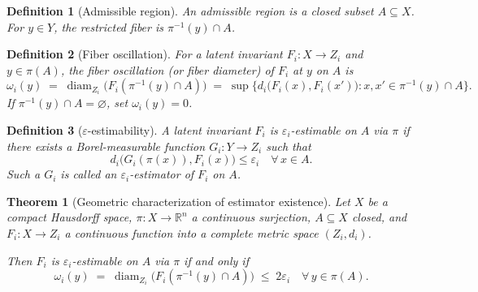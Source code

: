 \documentclass[11pt]{article}
\newtheorem{definition}{Definition}
\newtheorem{theorem}{Theorem}
\begin{document}
\begin{definition}[Admissible region]
An \emph{admissible region} is a closed subset $A\subseteq X$. For $y\in Y$, the \emph{restricted fiber} is $\pi^{-1}(y)\cap A$.
\end{definition}

\begin{definition}[Fiber oscillation]
For a latent invariant $F_i\colon X\to Z_i$ and $y\in\pi(A)$, the \emph{fiber oscillation} (or fiber diameter) of $F_i$ at $y$ on $A$ is
\[
\omega_i(y)\;=\;\operatorname{diam}_{Z_i}\!\bigl(F_i(\pi^{-1}(y)\cap A)\bigr)
\;=\;\sup\bigl\{d_i\bigl(F_i(x),F_i(x')\bigr): x,x'\in\pi^{-1}(y)\cap A\bigr\}.
\]
If $\pi^{-1}(y)\cap A=\varnothing$, set $\omega_i(y)=0$.
\end{definition}

\begin{definition}[$\varepsilon$-estimability]
A latent invariant $F_i$ is \emph{$\varepsilon_i$-estimable} on $A$ via $\pi$ if there exists a Borel-measurable function $G_i\colon Y\to Z_i$ such that
\begin{equation}\label{eq:estimability}
d_i\bigl(G_i(\pi(x)),F_i(x)\bigr)\leq\varepsilon_i\quad\forall\,x\in A.
\end{equation}
Such a $G_i$ is called an \emph{$\varepsilon_i$-estimator} of $F_i$ on $A$.
\end{definition}

\begin{theorem}[Geometric characterization of estimator existence]\label{thm:estimator}
Let $X$ be a compact Hausdorff space, $\pi\colon X\to\mathbb{R}^n$ a continuous surjection, $A\subseteq X$ closed, and $F_i\colon X\to Z_i$ a continuous function into a complete metric space $(Z_i,d_i)$.

Then $F_i$ is $\varepsilon_i$-estimable on $A$ via $\pi$ if and only if
\begin{equation}\label{eq:fiber-bound}
\omega_i(y)\;=\;\operatorname{diam}_{Z_i}\!\bigl(F_i(\pi^{-1}(y)\cap A)\bigr)\;\leq\;2\varepsilon_i\quad\forall\,y\in\pi(A).
\end{equation}
\end{theorem}
\end{document}
